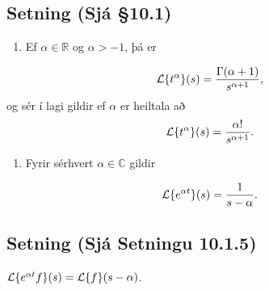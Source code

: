 \documentclass[a4paper,10pt,icelandic]{sphinxmanual}
\begin{document}
\subsection{Setning (Sjá \S{}10.1)}
\label{\detokenize{Kafli10:id2}}\begin{enumerate}
%
\item {} 
Ef \(\alpha\in \mathbb{R}\) og \(\alpha>-1\), þá er

\end{enumerate}
\begin{equation*}
\begin{split}{\cal L}\{t^\alpha\}(s)=\dfrac {\Gamma(\alpha+1)}{s^{\alpha+1}},\end{split}
\end{equation*}
og sér í lagi gildir ef \(\alpha\) er heiltala að
\begin{equation*}
\begin{split}{\cal L}\{t^\alpha\}(s)=\dfrac {\alpha!}{s^{\alpha+1}}.\end{split}
\end{equation*}\begin{enumerate}
%
\setcounter{enumi}{1}
\item {} 
Fyrir sérhvert \(\alpha\in {\mathbb{C}}\) gildir

\end{enumerate}
\begin{equation*}
\begin{split}{\cal L}\{e^{\alpha t}\}(s)=\dfrac{1}{s-\alpha}.\end{split}
\end{equation*}

\subsection{Setning (Sjá Setningu 10.1.5)}
\label{\detokenize{Kafli10:setning-sja-setningu-10-1-5}}
\({\cal L}\{e^{\alpha t}f\}(s) = {\cal L}\{f\}(s-\alpha)\).
\end{document}
